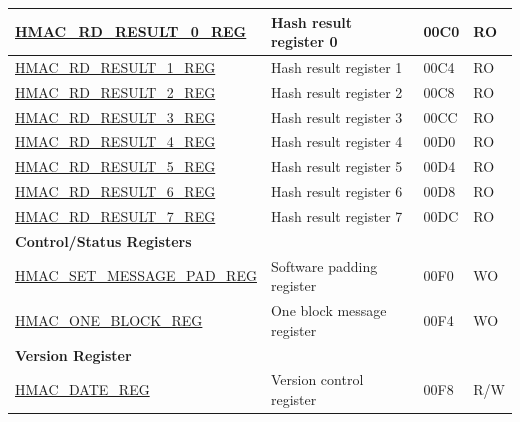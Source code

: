 \begin{longtable}{ | p{6cm} | p{7.2cm} | p{1.3cm} | p{1cm} | }
\hyperref[regdesc:HMACRDRESULTNREG]{HMAC\_RD\_RESULT\_0\_REG} & Hash result register 0 & \hexprefix{}00C0 & RO \\ \hline
\hyperref[regdesc:HMACRDRESULTNREG]{HMAC\_RD\_RESULT\_1\_REG} & Hash result register 1 & \hexprefix{}00C4 & RO \\ \hline
\hyperref[regdesc:HMACRDRESULTNREG]{HMAC\_RD\_RESULT\_2\_REG} & Hash result register 2 & \hexprefix{}00C8 & RO \\ \hline
\hyperref[regdesc:HMACRDRESULTNREG]{HMAC\_RD\_RESULT\_3\_REG} & Hash result register 3 & \hexprefix{}00CC & RO \\ \hline
\hyperref[regdesc:HMACRDRESULTNREG]{HMAC\_RD\_RESULT\_4\_REG} & Hash result register 4 & \hexprefix{}00D0 & RO \\ \hline
\hyperref[regdesc:HMACRDRESULTNREG]{HMAC\_RD\_RESULT\_5\_REG} & Hash result register 5 & \hexprefix{}00D4 & RO \\ \hline
\hyperref[regdesc:HMACRDRESULTNREG]{HMAC\_RD\_RESULT\_6\_REG} & Hash result register 6 & \hexprefix{}00D8 & RO \\ \hline
\hyperref[regdesc:HMACRDRESULTNREG]{HMAC\_RD\_RESULT\_7\_REG} & Hash result register 7 & \hexprefix{}00DC & RO \\ \hline
\multicolumn{4}{|l|}{\textbf{Control/Status Registers}} \\ \hline
\hyperref[regdesc:HMACSETMESSAGEPADREG]{HMAC\_SET\_MESSAGE\_PAD\_REG} & Software padding register & \hexprefix{}00F0 & WO \\ \hline
\hyperref[regdesc:HMACONEBLOCKREG]{HMAC\_ONE\_BLOCK\_REG} & One block message register & \hexprefix{}00F4 & WO \\ \hline
\multicolumn{4}{|l|}{\textbf{Version Register}} \\ \hline
\hyperref[regdesc:HMACDATEREG]{HMAC\_DATE\_REG} & Version control register & \hexprefix{}00F8 & R/W \\ \hline
\end{longtable}
